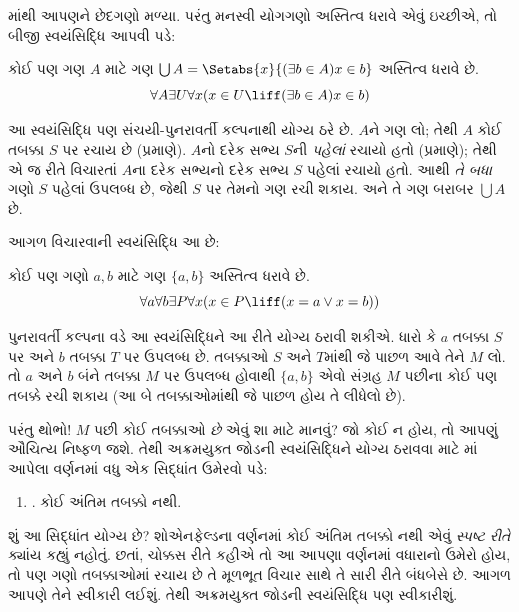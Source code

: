 \begingroup
\makeatletter{}\makeatother

\label{guunit:OLP-0540}


માંથી આપણને છેદગણો
મળ્યા. પરંતુ મનસ્વી યોગગણો અસ્તિત્વ ધરાવે એવું ઇચ્છીએ, તો
બીજી સ્વયંસિદ્ધિ આપવી પડે:

\begin{axiom}[યોગગણ]
કોઈ પણ ગણ $A$ માટે ગણ $\bigcup A =
\Setabs{x}{(\exists b \in A) x \in b}$ અસ્તિત્વ ધરાવે છે.
\[
\forall A \exists U \forall x(x \in U \liff (\exists b \in A)x \in b)
\]
\end{axiom}

આ સ્વયંસિદ્ધિ પણ સંચયી-પુનરાવર્તી કલ્પનાથી યોગ્ય ઠરે છે.
$A$ને ગણ લો; તેથી $A$ કોઈ તબક્કા $S$ પર રચાય છે
(\stageshier પ્રમાણે). $A$નો દરેક સભ્ય $S$ની \emph{પહેલાં}
રચાયો હતો (\stagesacc પ્રમાણે); તેથી એ જ રીતે વિચારતાં
$A$ના દરેક સભ્યનો દરેક સભ્ય $S$ પહેલાં રચાયો હતો.
આથી \emph{તે બધા} ગણો $S$ પહેલાં ઉપલબ્ધ છે, જેથી
$S$ પર તેમનો ગણ રચી શકાય. અને તે ગણ બરાબર $\bigcup A$ છે.
\endgroup

\begingroup
\makeatletter{}\makeatother

\label{guunit:OLP-0541}


આગળ વિચારવાની સ્વયંસિદ્ધિ આ છે:

\begin{axiom}[અક્રમયુક્ત જોડ]
કોઈ પણ ગણો $a, b$ માટે ગણ $\{a, b\}$ અસ્તિત્વ ધરાવે છે.
\[
\forall a \forall b \exists P \forall x (x \in P \liff (x = a \lor x = b))
\]
\end{axiom}

પુનરાવર્તી કલ્પના વડે આ સ્વયંસિદ્ધિને આ રીતે યોગ્ય ઠરાવી શકીએ.
ધારો કે $a$ તબક્કા $S$ પર અને $b$ તબક્કા $T$ પર ઉપલબ્ધ છે.
તબક્કાઓ $S$ અને $T$માંથી જે પાછળ આવે તેને $M$ લો. તો $a$ અને
$b$ બંને તબક્કા $M$ પર ઉપલબ્ધ હોવાથી $\{a,b\}$ એવો સંગ્રહ
$M$ પછીના કોઈ પણ તબક્કે રચી શકાય (આ બે તબક્કાઓમાંથી જે પાછળ હોય
તે લીધેલો છે).

પરંતુ થોભો!{} $M$ પછી કોઈ તબક્કાઓ \emph{છે} એવું શા માટે માનવું?
જો કોઈ ન હોય, તો આપણું ઔચિત્ય નિષ્ફળ જશે. તેથી અક્રમયુક્ત જોડની
સ્વયંસિદ્ધિને યોગ્ય ઠરાવવા માટે માં
આપેલા વર્ણનમાં વધુ એક સિદ્ધાંત ઉમેરવો પડે:
\begin{enumerate}
\item[] \stagessucc. કોઈ અંતિમ તબક્કો નથી.
\end{enumerate}
શું આ સિદ્ધાંત યોગ્ય છે? શોએનફેલ્ડના વર્ણનમાં કોઈ અંતિમ તબક્કો
નથી એવું \emph{સ્પષ્ટ રીતે} ક્યાંય કહ્યું નહોતું. છતાં,
ચોક્કસ રીતે કહીએ તો આ આપણા વર્ણનમાં વધારાનો ઉમેરો હોય, તો પણ
ગણો તબક્કાઓમાં રચાય છે તે મૂળભૂત વિચાર સાથે તે સારી રીતે બંધબેસે
છે. આગળ આપણે તેને સ્વીકારી લઈશું. તેથી અક્રમયુક્ત જોડની
સ્વયંસિદ્ધિ પણ સ્વીકારીશું.

